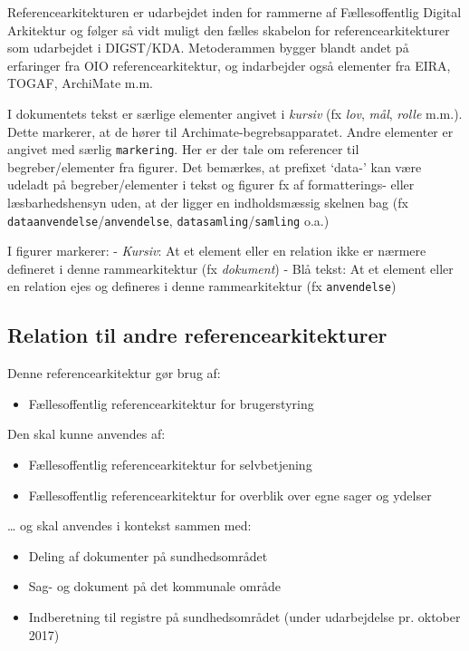 Referencearkitekturen er udarbejdet inden for rammerne af
Fællesoffentlig Digital Arkitektur og følger så vidt muligt den fælles
skabelon for referencearkitekturer som udarbejdet i DIGST/KDA.
Metoderammen bygger blandt andet på erfaringer fra OIO
referencearkitektur, og indarbejder også elementer fra EIRA, TOGAF,
ArchiMate m.m.

I dokumentets tekst er særlige elementer angivet i \emph{kursiv} (fx
\emph{lov}, \emph{mål}, \emph{rolle} m.m.). Dette markerer, at de hører
til Archimate-begrebsapparatet. Andre elementer er angivet med særlig
\texttt{markering}. Her er der tale om referencer til begreber/elementer
fra figurer. Det bemærkes, at prefixet `data-' kan være udeladt på
begreber/elementer i tekst og figurer fx af formatterings- eller
læsbarhedshensyn uden, at der ligger en indholdsmæssig skelnen bag (fx
\texttt{dataanvendelse}/\texttt{anvendelse},
\texttt{datasamling}/\texttt{samling} o.a.)

I figurer markerer: - \emph{Kursiv}: At et element eller en relation
ikke er nærmere defineret i denne rammearkitektur (fx \emph{dokument}) -
Blå tekst: At et element eller en relation ejes og defineres i denne
rammearkitektur (fx \texttt{anvendelse})

\subsection{Relation til andre
referencearkitekturer}\label{relation-til-andre-referencearkitekturer}

Denne referencearkitektur gør brug af:

\begin{itemize}
\tightlist
\item
  Fællesoffentlig referencearkitektur for brugerstyring
\end{itemize}

Den skal kunne anvendes af:

\begin{itemize}
\tightlist
\item
  Fællesoffentlig referencearkitektur for selvbetjening
\item
  Fællesoffentlig referencearkitektur for overblik over egne sager og
  ydelser
\end{itemize}

\ldots{} og skal anvendes i kontekst sammen med:

\begin{itemize}
\tightlist
\item
  Deling af dokumenter på sundhedsområdet
\item
  Sag- og dokument på det kommunale område
\item
  Indberetning til registre på sundhedsområdet (under udarbejdelse pr.
  oktober 2017)
\end{itemize}


